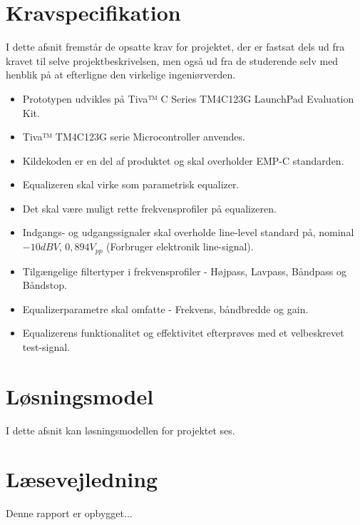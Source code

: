 
\section{Kravspecifikation} \label{afs:kravspecifikation}
I dette afsnit fremstår de opsatte krav for projektet, der er fastsat dels ud fra kravet til selve projektbeskrivelsen, men også ud fra de studerende selv med henblik på at efterligne den virkelige ingeniørverden.

\begin{itemize}
	\item Prototypen udvikles på Tiva™ C Series TM4C123G LaunchPad Evaluation Kit.
	\item Tiva™ TM4C123G serie Microcontroller anvendes.
	\item Kildekoden er en del af produktet og skal overholder EMP-C standarden.
	\item Equalizeren skal virke som parametrisk equalizer.
	\item Det skal være muligt rette frekvensprofiler på equalizeren.
	\item Indgangs- og udgangssignaler skal overholde line-level standard på, nominal $-10 dBV$, $0,894 V_{pp}$ (Forbruger elektronik line-signal).
	\item Tilgængelige filtertyper i frekvensprofiler - Højpass, Lavpass, Båndpass og Båndstop.
	\item Equalizerparametre skal omfatte - Frekvens, båndbredde og gain.
	\item Equalizerens funktionalitet og effektivitet efterprøves med et velbeskrevet test-signal.
\end{itemize}

\section{Løsningsmodel}
I dette afsnit kan løsningsmodellen for projektet ses.

\section{Læsevejledning}
Denne rapport er opbygget...
